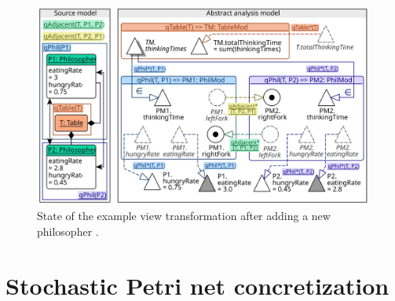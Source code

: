 \begin{figure}
  \centering
  \includegraphics[scale=0.9]{figures/view_transformation_example}
  \caption{State of the example view transformation after adding a new philosopher .}
  \label{fig:transform:view-3}
\end{figure}

\section{Stochastic Petri net concretization}
\label{chap:transform:concretizer}